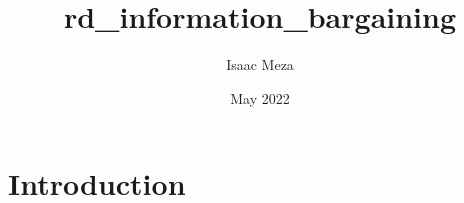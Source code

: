\documentclass{article}
\title{rd_information_bargaining}
\author{Isaac Meza}
\date{May 2022}
\begin{document}
\maketitle

\section{Introduction}
\end{document}
